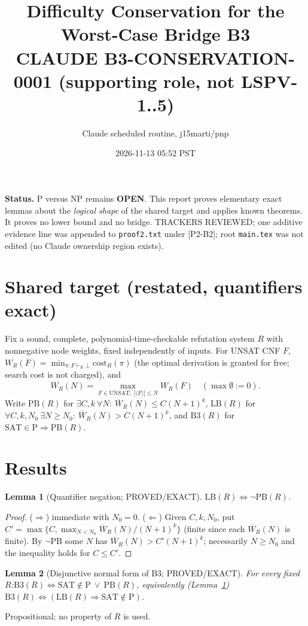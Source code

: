 \documentclass[11pt]{article}
\title{Difficulty Conservation for the Worst-Case Bridge B3\\
\large CLAUDE B3-CONSERVATION-0001 (supporting role, not LSPV-1..5)}
\author{Claude scheduled routine, j15marti/pnp}
\date{2026-11-13 05:52 PST}
\newtheorem{lemma}{Lemma}
\theoremstyle{definition}
\begin{document}
\maketitle

\noindent\textbf{Status.} P versus NP remains \textbf{OPEN}. This report proves
elementary exact lemmas about the \emph{logical shape} of the shared target and
applies known theorems. It proves no lower bound and no bridge.
TRACKERS REVIEWED; one additive evidence line was appended to \texttt{proof2.txt}
under [P2-B2]; root \texttt{main.tex} was not edited (no Claude ownership region exists).

\section{Shared target (restated, quantifiers exact)}
Fix a sound, complete, polynomial-time-checkable refutation system $R$ with
nonnegative node weights, fixed independently of inputs. For UNSAT CNF $F$,
$W_R(F)=\min_{\pi:F\vdash_R\bot}\mathrm{cost}_R(\pi)$ (the optimal derivation is
granted for free; search cost is not charged), and
\[
\overline W_R(N)=\max_{F\in\mathrm{UNSAT},\ |\langle F\rangle|\le N} W_R(F)
\quad(\max\emptyset:=0).
\]
Write $\mathrm{PB}(R)$ for $\exists C,k\ \forall N:\ \overline W_R(N)\le C(N+1)^k$,
$\mathrm{LB}(R)$ for $\forall C,k,N_0\ \exists N\ge N_0:\ \overline W_R(N)>C(N+1)^k$,
and $\mathrm{B3}(R)$ for $\mathrm{SAT}\in\mathrm P\Rightarrow \mathrm{PB}(R)$.

\section{Results}
\begin{lemma}[Quantifier negation; PROVED/EXACT]\label{l0}
$\mathrm{LB}(R)\iff\neg\mathrm{PB}(R)$.
\end{lemma}
\begin{proof}
($\Rightarrow$) immediate with $N_0=0$. ($\Leftarrow$) Given $C,k,N_0$, put
$C'=\max\{C,\max_{N<N_0}\overline W_R(N)/(N+1)^k\}$ (finite since each
$\overline W_R(N)$ is finite). By $\neg\mathrm{PB}$ some $N$ has
$\overline W_R(N)>C'(N+1)^k$; necessarily $N\ge N_0$ and the inequality holds for $C\le C'$.
\end{proof}

\begin{lemma}[Disjunctive normal form of B3; PROVED/EXACT]\label{l1}
For every fixed $R$:\quad $\mathrm{B3}(R)\iff \mathrm{SAT}\notin\mathrm P\ \vee\ \mathrm{PB}(R)$,
equivalently (Lemma~\ref{l0}) $\mathrm{B3}(R)\iff(\mathrm{LB}(R)\Rightarrow\mathrm{SAT}\notin\mathrm P)$.
\end{lemma}
\noindent Propositional; no property of $R$ is used.
\end{document}
